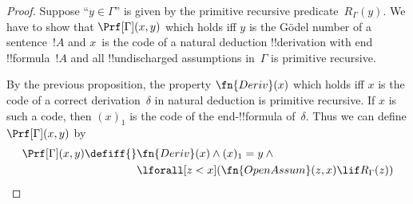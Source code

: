 \documentclass[../../../include/open-logic-section]{subfiles}
\begin{document}
\begin{proof}
Suppose ``$y \in \Gamma$'' is given by the primitive recursive
predicate~$R_\Gamma(y)$.  We have to show that $\Prf[\Gamma](x, y)$
which holds iff $y$ is the G\"odel number of a sentence~$!A$ and
$x$~is the code of a natural deduction !!{derivation} with end
!!{formula}~$!A$ and all !!{undischarged} assumptions in~$\Gamma$ is
primitive recursive.

By the previous proposition, the property $\fn{Deriv}(x)$ which holds
iff $x$ is the code of a correct derivation~$\delta$ in natural
deduction is primitive recursive. If $x$ is such a code, then $(x)_1$
is the code of the end-!!{formula} of~$\delta$. Thus we can define
$\Prf[\Gamma](x, y)$ by
\begin{align*}
\Prf[\Gamma](x, y) \defiff {} &
\fn{Deriv}(x) \land (x)_1 = y \land {} \\
& \lforall[z < x](\fn{OpenAssum}(z, x) \lif R_\Gamma(z))
\end{align*}
\end{proof}
\end{document}
